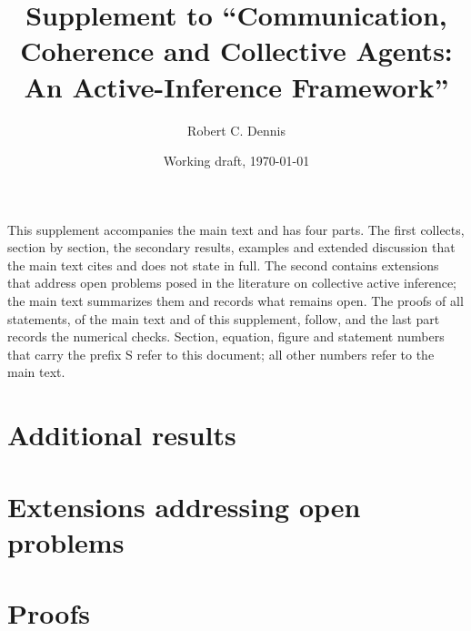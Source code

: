 \documentclass[11pt]{article}
\title{Supplement to ``Communication, Coherence and Collective Agents:\\An Active-Inference Framework''}
\author{Robert C. Dennis}
\date{Working draft, \today}
\begin{document}
\maketitle

\noindent This supplement accompanies the main text and has four parts. The first collects, section by section, the secondary results, examples and extended discussion that the main text cites and does not state in full. The second contains extensions that address open problems posed in the literature on collective active inference; the main text summarizes them and records what remains open. The proofs of all statements, of the main text and of this supplement, follow, and the last part records the numerical checks. Section, equation, figure and statement numbers that carry the prefix S refer to this document; all other numbers refer to the main text.

\tableofcontents

\part{Additional results}\label{sup:part-results}



















\part{Extensions addressing open problems}\label{sup:part-ext}










\part{Proofs}\label{sup:part-proofs}






















\end{document}
